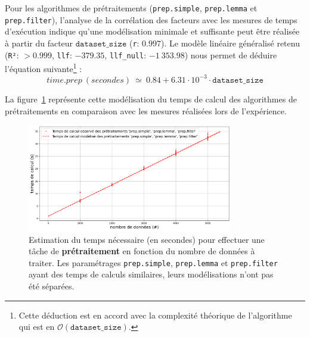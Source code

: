			Pour les algorithmes de prétraitements (\texttt{prep.simple}, \texttt{prep.lemma} et \texttt{prep.filter}), l'analyse de la corrélation des facteurs avec les mesures de temps d'exécution indique qu'une modélisation minimale et suffisante peut être réalisée à partir du facteur $\texttt{dataset\_size}$ (\texttt{r}: $0.997$).
			Le modèle linéaire généralisé retenu (\texttt{R²}: $> 0.999$, \texttt{llf}: $-379.35$, \texttt{llf\_null}: $-1~353.98$) nous permet de déduire l'équation suivante\footnote{Cette déduction est en accord avec la complexité théorique de l'algorithme qui est en $ \mathcal{O}(\texttt{dataset\_size}) $.} :
			\begin{equation}
				time.prep~(secondes)~
				\simeq~0.84 + 6.31 \cdot 10^{-3} \cdot \texttt{dataset\_size}
			\end{equation}
			
			La figure~\ref{figure:4.3.2-ETUDE-COUTS-TEMPS-CALCUL-MODELISATION-PREPROCESSING} représente cette modélisation du temps de calcul des algorithmes de prétraitements en comparaison avec les mesures réalisées lors de l'expérience.
			\newline
			\begin{figure}[!htb]
				\centering
				\includegraphics[width=0.8\textwidth]{figures/etude-temps-calcul-modelisation-1prep}
				\caption{Estimation du temps nécessaire (en secondes) pour effectuer une tâche de \textbf{prétraitement} en fonction du nombre de données à traiter. Les paramétrages \texttt{prep.simple}, \texttt{prep.lemma} et \texttt{prep.filter} ayant des temps de calculs similaires, leurs modélisations n'ont pas été séparées.}
				\label{figure:4.3.2-ETUDE-COUTS-TEMPS-CALCUL-MODELISATION-PREPROCESSING}
			\end{figure}
			
			
